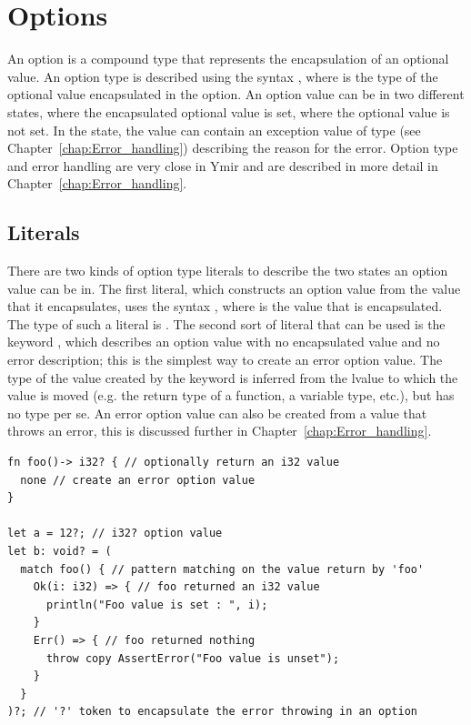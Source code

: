 \section{Options}%
\label{sec:compound:options}

An option is a compound type that represents the encapsulation of an optional
value. An option type is described using the syntax , where
 is the type of the optional value encapsulated in the option. An
option value can be in two different states,  where the encapsulated
optional value is set,  where the optional value is not set. In the
 state, the value can contain an exception value of type
 (see Chapter~\ref{chap:Error_handling}) describing the
reason for the error. Option type and error handling are very close in Ymir and
are described in more detail in Chapter~\ref{chap:Error_handling}.

\subsection{Literals}

There are two kinds of option type literals to describe the two states an option
value can be in. The first literal, which constructs an option value from the
value that it encapsulates, uses the syntax , where  is the
value that is encapsulated. The type of such a literal is .
The second sort of literal that can be used is the keyword , which
describes an option value with no encapsulated value and no error description;
this is the simplest way to create an error option value. The type of the value
created by the keyword  is inferred from the lvalue to which the
value is moved (e.g. the return type of a function, a variable type, etc.), but
has no type per se. An error option value can also be created from a value that
throws an error, this is discussed further in Chapter~\ref{chap:Error_handling}.

\begin{lstlisting}[style=coloredverbatimError]
fn foo()-> i32? { // optionally return an i32 value
  none // create an error option value
}

let a = 12?; // i32? option value
let b: void? = (
  match foo() { // pattern matching on the value return by 'foo'
    Ok(i: i32) => { // foo returned an i32 value
      println("Foo value is set : ", i);
    }
    Err() => { // foo returned nothing
      throw copy AssertError("Foo value is unset");
    }
  }
)?; // '?' token to encapsulate the error throwing in an option

\end{lstlisting}

